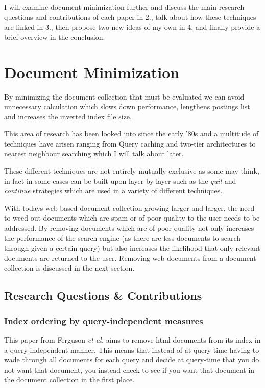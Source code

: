 \documentclass{acm_proc_article-sp}
\begin{document}
I will examine document minimization further and discuss the main research questions and contributions of each paper in 2., talk about how these techniques are linked in 3., then propose two new ideas of my own in 4. and finally provide a brief overview in the conclusion.

\section{Document Minimization}

By minimizing the document collection that must be evaluated we can avoid unnecessary calculation which slows down performance, lengthens postings list and increases the inverted index file size.

This area of research has been looked into since the early '80s and a multitude of techniques have arisen ranging from Query caching \cite{Lempel:2003} and two-tier architectures \cite{Fagni:2006} to nearest neighbour searching \cite{Smeaton:1981} which I will talk about later.

These different techniques are not entirely mutually exclusive as some may think, in fact in some cases can be built upon layer by layer such as the \emph{quit} and \emph{continue} strategies \cite{Moffat:1996} which are used in a variety of different techniques. 

With todays web based document collection growing larger and larger, the need to weed out documents which are spam or of poor quality to the user needs to be addressed. By removing documents which are of poor quality not only increases the performance of the search engine (as there are less documents to search through given a certain query) but also increases the likelihood that only relevant documents are returned to the user. Removing web documents from a document collection is discussed in the next section.

\subsection{Research Questions \& Contributions}
\subsubsection{Index ordering by query-independent measures}
This paper from Ferguson \emph{et al.} aims to remove html documents from its index in a query-independent manner. This means that instead of at query-time having to wade through all documents for each query and decide at query-time that you do not want that document, you instead check to see if you want that document in the document collection in the first place. 
\end{document}
